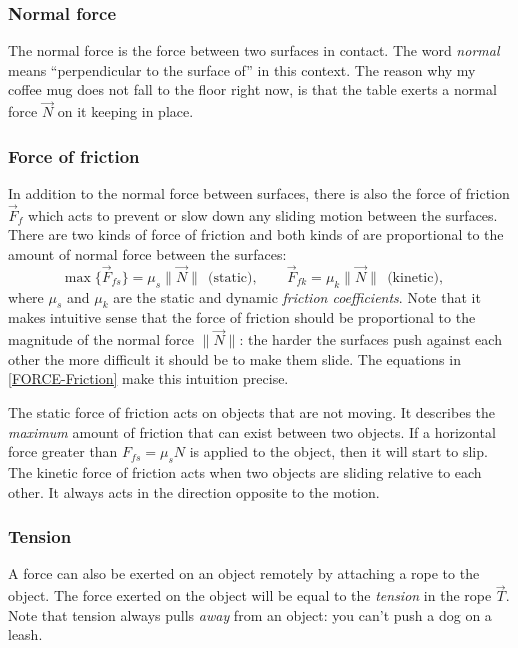 \documentclass[letterpaper,9pt,journal]{IEEEtran}
\newcommand{\be}{\begin{equation}}
\newcommand{\ee}{\end{equation}}
\begin{document}
\subsubsection{Normal force}
The normal force is the force between two surfaces in contact. 
The word \emph{normal} means ``perpendicular to the surface of'' in this context.
The reason why my coffee mug does not fall to the floor right now, 
is that the table exerts a normal force $\vec{N}$ on it keeping in place.


\subsubsection{Force of friction}

In addition to the normal force between surfaces, there is also the force of
friction $\vec{F}_f$ which acts to prevent or slow down any sliding motion between the surfaces.
There are two kinds of force of friction and both kinds of are proportional to the amount of 
normal force between the surfaces:
\be
  \max \{ \vec{F}_{fs} \}=\mu_s\|\vec{N}\| \ \ \text{(static)}, \qquad \vec{F}_{fk}=\mu_k\|\vec{N}\| \ \ \text{(kinetic)},
 \quad  \label{FORCE-Friction}
\ee
where $\mu_s$ and $\mu_k$ are the static and dynamic \emph{friction coefficients}.
Note that it makes intuitive sense that the force of friction should be proportional to the
magnitude of the normal force $\|\vec{N}\|$: the harder the surfaces push against each
other the more difficult it should be to make them slide. 
The equations in \eqref{FORCE-Friction} make this intuition precise.

The static force of friction acts on objects that are not moving.
It describes the \emph{maximum} amount of friction that  can exist between two objects. 
If a horizontal force greater than $F_{fs} = \mu_s N$ is applied to the object, 
then it will start to slip.
The kinetic force of friction acts when two objects are sliding relative to each other. 
It always acts in the direction opposite to the motion. 


\subsubsection{Tension}
A force can also be exerted on an object remotely by attaching a rope to the object.
The force exerted on the object will be equal to the \emph{tension} in the rope $\vec{T}$.
Note that tension always pulls \emph{away} from an object:  you can't push a dog on a leash.


\vspace{-3mm}
\end{document}
